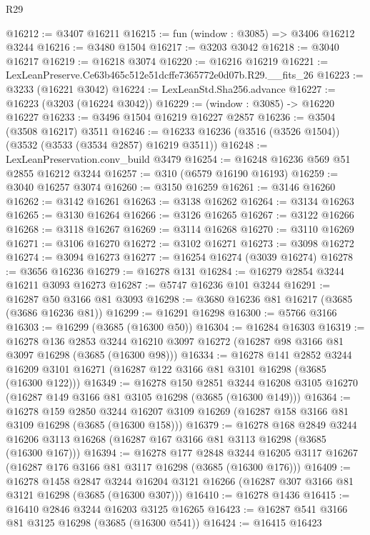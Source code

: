 \begin{lexlean}{R29}
\begin{coremodule}
@16212 := @3407 @16211
@16215 := fun (window : @3085) => @3406 @16212 @3244
@16216 := @3480 @1504
@16217 := @3203 @3042
@16218 := @3040 @16217
@16219 := @16218 @3074
@16220 := @16216 @16219
@16221 := LexLeanPreserve.Ce63b465c512e51dcffe7365772e0d07b.R29.__fits_26
@16223 := @3233 (@16221 @3042)
@16224 := LexLeanStd.Sha256.advance
@16227 := @16223 (@3203 (@16224 @3042))
@16229 := (window : @3085) -> @16220 @16227
@16233 := @3496 @1504 @16219 @16227 @2857
@16236 := @3504 (@3508 @16217) @3511
@16246 := @16233 @16236 (@3516 (@3526 @1504)) (@3532 (@3533 (@3534 @2857) @16219 @3511))
@16248 := LexLeanPreservation.conv_build @3479
@16254 := @16248 @16236 @569 @51 @2855 @16212 @3244
@16257 := @310 (@6579 @16190 @16193)
@16259 := @3040 @16257 @3074
@16260 := @3150 @16259
@16261 := @3146 @16260
@16262 := @3142 @16261
@16263 := @3138 @16262
@16264 := @3134 @16263
@16265 := @3130 @16264
@16266 := @3126 @16265
@16267 := @3122 @16266
@16268 := @3118 @16267
@16269 := @3114 @16268
@16270 := @3110 @16269
@16271 := @3106 @16270
@16272 := @3102 @16271
@16273 := @3098 @16272
@16274 := @3094 @16273
@16277 := @16254 @16274 (@3039 @16274)
@16278 := @3656 @16236
@16279 := @16278 @131
@16284 := @16279 @2854 @3244 @16211 @3093 @16273
@16287 := @5747 @16236 @101 @3244
@16291 := @16287 @50 @3166 @81 @3093
@16298 := @3680 @16236 @81 @16217 (@3685 (@3686 @16236 @81))
@16299 := @16291 @16298
@16300 := @5766 @3166
@16303 := @16299 (@3685 (@16300 @50))
@16304 := @16284 @16303
@16319 := @16278
    @136
    @2853
    @3244
    @16210
    @3097
    @16272
    (@16287 @98 @3166 @81 @3097 @16298 (@3685 (@16300 @98)))
@16334 := @16278
    @141
    @2852
    @3244
    @16209
    @3101
    @16271
    (@16287 @122 @3166 @81 @3101 @16298 (@3685 (@16300 @122)))
@16349 := @16278
    @150
    @2851
    @3244
    @16208
    @3105
    @16270
    (@16287 @149 @3166 @81 @3105 @16298 (@3685 (@16300 @149)))
@16364 := @16278
    @159
    @2850
    @3244
    @16207
    @3109
    @16269
    (@16287 @158 @3166 @81 @3109 @16298 (@3685 (@16300 @158)))
@16379 := @16278
    @168
    @2849
    @3244
    @16206
    @3113
    @16268
    (@16287 @167 @3166 @81 @3113 @16298 (@3685 (@16300 @167)))
@16394 := @16278
    @177
    @2848
    @3244
    @16205
    @3117
    @16267
    (@16287 @176 @3166 @81 @3117 @16298 (@3685 (@16300 @176)))
@16409 := @16278
    @1458
    @2847
    @3244
    @16204
    @3121
    @16266
    (@16287 @307 @3166 @81 @3121 @16298 (@3685 (@16300 @307)))
@16410 := @16278 @1436
@16415 := @16410 @2846 @3244 @16203 @3125 @16265
@16423 := @16287 @541 @3166 @81 @3125 @16298 (@3685 (@16300 @541))
@16424 := @16415 @16423

\end{coremodule}
\end{lexlean}
